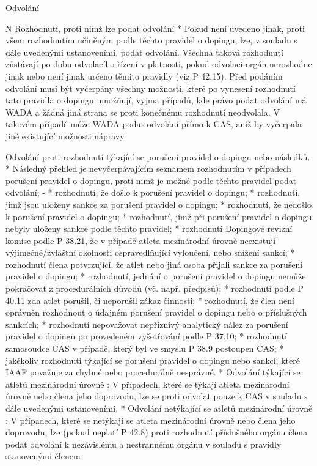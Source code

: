 \secc Odvolání

\begitems \style N
Rozhodnutí, proti nimž lze podat odvolání
* Pokud není uvedeno jinak, proti všem rozhodnutím učiněným podle těchto pravidel o dopingu, lze, v souladu s dále uvedenými ustanoveními, podat odvolání. Všechna taková rozhodnutí zůstávají po dobu odvolacího řízení v platnosti, pokud odvolací orgán nerozhodne jinak nebo není jinak určeno těmito pravidly (viz P 42.15).  Před podáním odvolání musí být vyčerpány všechny možnosti, které po vynesení rozhodnutí tato pravidla o dopingu umožňují, vyjma případů, kde právo podat odvolání má WADA a žádná jiná strana se proti konečnému rozhodnutí neodvolala. V takovém případě může WADA podat odvolání přímo k CAS, aniž by vyčerpala jiné existující možnosti nápravy.

Odvolání proti rozhodnutí týkající se porušení pravidel o dopingu nebo následků.
* Následný přehled je nevyčerpávajícím seznamem rozhodnutím v případech porušení pravidel o dopingu, proti nimž je možné podle těchto pravidel podat odvolání;
  \begitems \style -
  * rozhodnutí, že došlo k porušení pravidel o dopingu;
  * rozhodnutí, jímž jsou uloženy sankce za porušení pravidel o dopingu;
  * rozhodnutí, že nedošlo k porušení pravidel o dopingu;
  * rozhodnutí, jímž při porušení pravidel o dopingu nebyly uloženy sankce podle těchto pravidel;
  * rozhodnutí Dopingové revizní komise podle P 38.21, že v případě atleta mezinárodní úrovně neexistují výjimečné/zvláštní okolnosti ospravedlňující vyloučení, nebo snížení sankcí;
  * rozhodnutí člena potvrzující, že atlet nebo jiná osoba přijali sankce za porušení pravidel o dopingu;
  * rozhodnutí, jednání o porušení pravidel o dopingu nemůže pokračovat z procedurálních důvodů (vč. např. předpisů);
  * rozhodnutí podle P 40.11 zda atlet porušil, či neporušil zákaz činnosti;
  * rozhodnutí, že člen není oprávněn rozhodnout o údajném porušení pravidel o dopingu nebo o příslušných sankcích;
  * rozhodnutí nepovažovat nepříznivý analytický nález za porušení pravidel o dopingu po provedeném vyšetřování podle P 37.10;
  * rozhodnutí samosoudce CAS v případě, který byl ve smyslu P 38.9 postoupen CAS;
  * jakékoliv rozhodnutí týkající se porušení pravidel o dopingu nebo sankcí, které IAAF považuje za chybné nebo procedurálně nesprávné.
  \enditems
* Odvolání týkající se atletů mezinárodní úrovně : V  případech, které se týkají atleta mezinárodní úrovně nebo člena jeho doprovodu, lze se proti odvolat pouze k CAS v souladu s dále uvedenými ustanoveními.
* Odvolání netýkající se atletů mezinárodní úrovně : V případech, které se netýkají se atleta mezinárodní úrovně nebo člena jeho doprovodu, lze (pokud neplatí P 42.8) proti rozhodnutí příslušného orgánu člena podat odvolání k nezávislému a nestrannému orgánu v souladu s pravidly stanovenými členem

